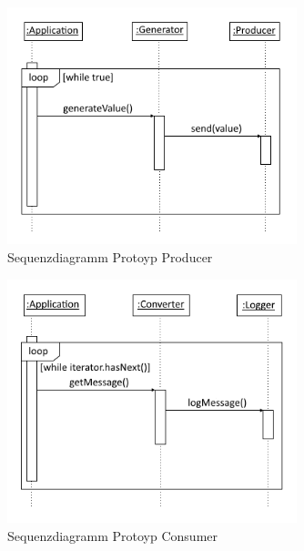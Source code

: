 \begin{figure}[htb!]
\centering
\includegraphics[width=0.75\textwidth]{bilder/sequenceProducer.png}
\caption{Sequenzdiagramm Protoyp Producer
\label{fig:seqProducer}}
\end{figure}

\begin{figure}[htb!]
\centering
\includegraphics[width=0.75\textwidth]{bilder/sequenceConsumer.png}
\caption{Sequenzdiagramm Protoyp Consumer
\label{fig:seqConsumer}}
\end{figure}

